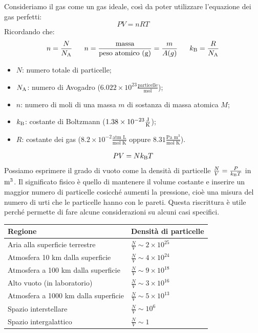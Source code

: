 Consideriamo il gas come un gas ideale, così da poter utilizzare l'equazione dei gas perfetti:
\begin{equation*}
    PV = nRT
\end{equation*}
Ricordando che:
\begin{equation*}
    n=\frac N {N_{\text A}} \ \ \ \ \ n=\frac{\text{massa}}{\text{peso atomico (g)}}=\frac{m}{A(g)} \ \ \ \ \ k_{\text B}=\frac{R}{N_{\text A}}
\end{equation*}
\begin{itemize}
    \item $N$: numero totale di particelle;
    \item $N_{\text A}$: numero di Avogadro ($6.022 \times 10^{23} \frac{\text{particelle}}{\text{mol}}$);
    \item $n$: numero di moli di una massa $m$ di sostanza di massa atomica $M$;
    \item $k_{\text B}$: costante di Boltzmann ($1.38 \times 10^{-23} \frac{\text J}{\text K}$);
    \item $R$: costante dei gas ($8.2\times 10^{-2} \frac{\text{atm L}}{\text{mol K}}$ oppure $8.31 \frac{\text{Pa m}^3}{\text{mol K}}$).
\end{itemize}
\begin{equation*}
    PV=Nk_{\text B}T
\end{equation*}
Possiamo esprimere il grado di vuoto come la densità di particelle $\frac NV=\frac{P}{k_{\text B}T}$ in $\text m^3$. Il significato fisico è quello di mantenere il volume costante e inserire un maggior numero di particelle cosicché aumenti la pressione, cioè una misura del numero di urti che le particelle hanno con le pareti. Questa riscrittura è utile perché permette di fare alcune considerazioni su alcuni casi specifici.

\begin{center}
    \begin{tabular}{ll}
        \toprule
        Regione & Densità di particelle \\
        \midrule
        Aria alla superficie terrestre & $\frac N V \sim 2\times10^{25}$ \\
        Atmosfera 10 km dalla superficie & $\frac N V \sim 4 \times10^{24}$ \\
        Atmosfera a 100 km dalla superficie & $\frac N V \sim 9 \times10^{18}$ \\
        Alto vuoto (in laboratorio) & $\frac N V \sim 3 \times10^{16}$ \\
        Atmosfera a 1000 km dalla superficie & $\frac N V \sim 5 \times 10^{13}$ \\
        Spazio interstellare & $\frac N V \sim 10^6$ \\
        Spazio intergalattico & $\frac N V \sim 1$ \\
        \bottomrule
    \end{tabular} \\
\end{center}

